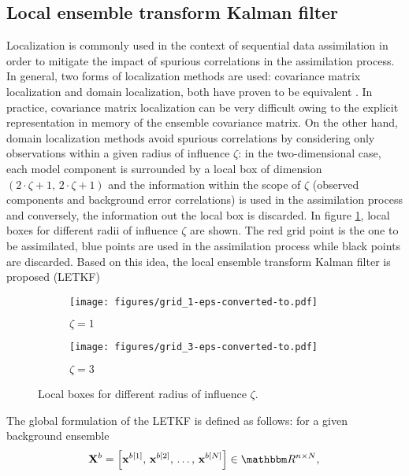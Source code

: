 \documentclass[12pt]{article}
\newcommand{\ra}{\zeta}
\newcommand{\Nens}{N} \newcommand{\Nobs}{m} \newcommand{\Nstate}{n} \newcommand{\X}{{\bf X}} \newcommand{\x}{{\bf x}} \newcommand{\J}{\mathcal{J}} \newcommand{\lp}{\left (} \newcommand{\rp}{\right )} \newcommand{\lb}{\left [} \newcommand{\rb}{\right ]} \renewcommand{\ln}{\left \|} \newcommand{\rn}{\right \|}
\begin{document}
\subsection{Local ensemble transform Kalman filter}
\label{subsec:local-ensemble-transform}

Localization is commonly used in the context of sequential data assimilation in order to mitigate the impact of spurious correlations in the assimilation process. In general, two forms of localization methods are used: covariance matrix localization and domain localization, both have proven to be equivalent \cite{localization_methods}. In practice, covariance matrix localization can be very difficult owing to the explicit representation in memory of the ensemble covariance matrix. On the other hand, domain localization methods avoid spurious correlations by considering only observations within a given radius of influence $\ra$: in the two-dimensional case, each model component is surrounded by a local box of dimension $(2 \cdot \ra+1,\,2\cdot \ra+1)$ and the information within the scope of $\ra$ (observed components and background error correlations) is used in the assimilation process and conversely, the information out the local box is discarded. In figure \ref{fig:local-boxes}, local boxes for different radii of influence $\ra$ are shown. The red grid point is the one to be assimilated, blue points are used in the assimilation process while black points are discarded. Based on this idea, the local ensemble transform Kalman filter is proposed (LETKF) \cite{TELA:TELA076} 
\begin{figure}[htp]
\centering
\begin{subfigure}[b]{0.45\textwidth}
\centering
\texttt{[image: figures/grid\_1-eps-converted-to.pdf]}
\caption{$\ra=1$}
\end{subfigure}\hspace{1em}
\begin{subfigure}[b]{0.45\textwidth}
\centering
\texttt{[image: figures/grid\_3-eps-converted-to.pdf]}
\caption{$\ra=3$}
\end{subfigure}
\caption{Local boxes for different radius of influence $\ra$.}
\label{fig:local-boxes}
\end{figure}
The global formulation of the LETKF is defined as follows: for a given background ensemble
\begin{eqnarray}
\label{eq:background-ensemble}
\displaystyle
\X^b = \lb \x^{b[1]},\, \x^{b[2]},\, \ldots,\, \x^{b[\Nens]} \rb \in \Re^{\Nstate \times \Nens} ,\,
\end{eqnarray}
\end{document}
